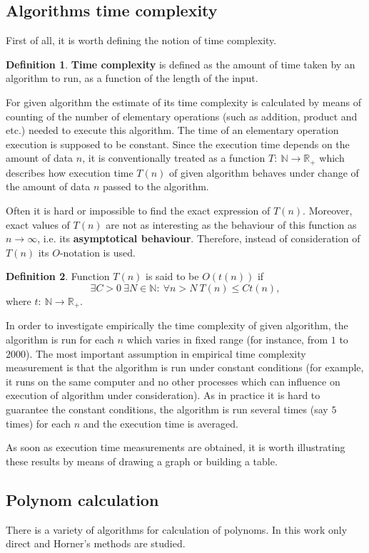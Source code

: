 \documentclass[12pt, bachelor, substylefile = algo_title.rtx]{disser}
\theoremstyle{definition}
\newtheorem{definition}{Definition}
\begin{document}
\subsection{Algorithms time complexity}
First of all, it is worth defining the notion of time complexity.
\begin{definition}
\textbf{ Time complexity} is defined as the amount of time taken by an algorithm to run, as a function of the length of the input.
\end{definition}
For given algorithm the estimate of its time complexity is calculated by means of counting of the number of elementary operations (such as addition, product and etc.) needed to execute this algorithm. The time of an elementary operation execution is supposed to be constant. Since the execution time depends on the amount of data $n$, it is conventionally treated as a function $T:\ \mathbb{N} \to \mathbb{R}_+$ which describes how execution time $T(n)$ of given algorithm behaves under change of the amount of data $n$ passed to the algorithm.

Often it is hard or impossible to find the exact expression of $T(n)$. Moreover, exact values of $T(n)$ are not as interesting as the behaviour of this function as $n \to \infty$, i.e. its \textbf{asymptotical behaviour}. Therefore, instead of consideration of $T(n)$ its $O$-notation is used.
\begin{definition}
Function $T(n)$ is said to be $O(t(n))$ if \[\exists C>0\ \exists N \in \mathbb{N}:\ \forall n>N\ T(n) \le C t(n),\]
where $t:\ \mathbb{N} \to \mathbb{R}_+$.
\end{definition}

In order to investigate empirically the time complexity of given algorithm, the algorithm is run for each $n$ which varies in fixed range (for instance, from $1$ to $2000$). The most important assumption in empirical time complexity measurement is that the algorithm is run under constant conditions (for example, it runs on the same computer and no other processes which can influence on execution of algorithm under consideration). As in practice it is hard to guarantee the constant conditions, the algorithm is run several times (say $5$ times) for each $n$ and the execution time is averaged.

As soon as execution time measurements are obtained, it is worth illustrating these results by means of drawing a graph or building a table.

\subsection{Polynom calculation}
There is a variety of algorithms for calculation of polynoms. In this work only direct and Horner's methods are studied.
\end{document}
